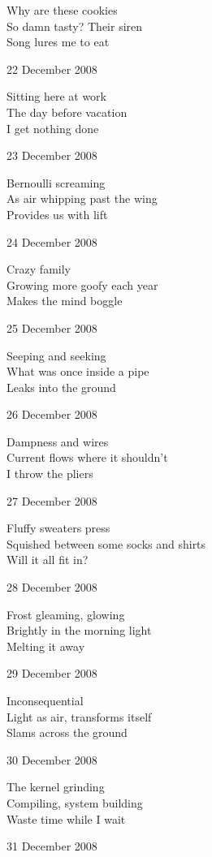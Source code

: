 \documentclass[12pt]{article}
\begin{document}
Why are these cookies  \\
So damn tasty? Their siren \\
Song lures me to eat

22 December 2008

Sitting here at work \\
The day before vacation \\
I get nothing done

23 December 2008

Bernoulli screaming \\
As air whipping past the wing \\
Provides us with lift

24 December 2008

Crazy family \\
Growing more goofy each year \\
Makes the mind boggle


\newpage

25 December 2008

Seeping and seeking \\
What was once inside a pipe \\
Leaks into the ground

26 December 2008

Dampness and wires \\
Current flows where it shouldn't \\
I throw the pliers

27 December 2008

Fluffy sweaters press \\
Squished between some socks and shirts \\
Will it all fit in?

28 December 2008

Frost gleaming, glowing \\
Brightly in the morning light \\
Melting it away

29 December 2008

Inconsequential \\
Light as air, transforms itself \\
Slams across the ground

30 December 2008

The kernel grinding \\
Compiling, system building \\
Waste time while I wait

31 December 2008
\end{document}
